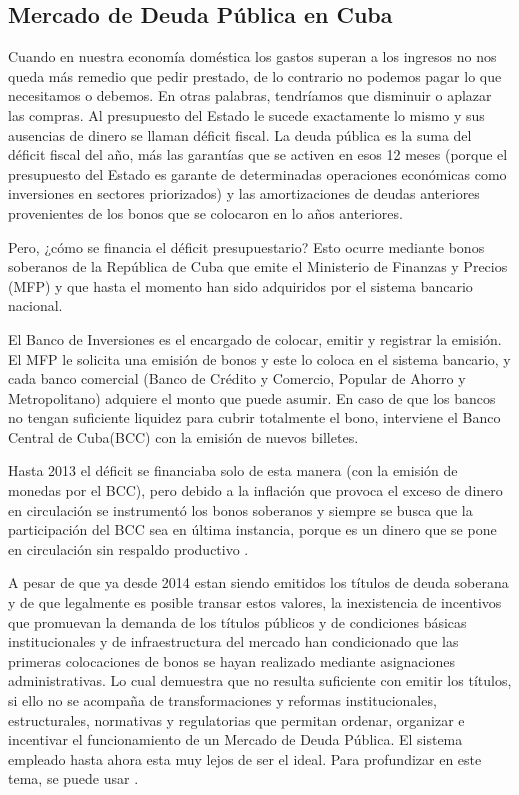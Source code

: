   \subsection{Mercado de Deuda Pública en Cuba} \hspace*{}

    Cuando en nuestra economía doméstica los gastos superan a los ingresos no nos queda más remedio que pedir prestado, de lo contrario 
    no podemos pagar lo que necesitamos o debemos. En otras palabras, tendríamos que disminuir o aplazar las compras. Al presupuesto del 
    Estado le sucede exactamente lo mismo y sus ausencias de dinero se llaman déficit fiscal. La deuda pública es la suma del déficit 
    fiscal del año, más las garantías que se activen en esos 12 meses (porque el presupuesto del Estado es garante de determinadas 
    operaciones económicas como inversiones en sectores priorizados) y las amortizaciones de deudas anteriores provenientes de los bonos 
    que se colocaron en lo años anteriores.

    Pero, ¿cómo se financia el déficit presupuestario? Esto ocurre mediante bonos soberanos de la República de 
    Cuba que emite el Ministerio de Finanzas y Precios (MFP) y que hasta el momento han sido adquiridos por el sistema bancario nacional.

    El Banco de Inversiones es el encargado de colocar, emitir y registrar la emisión. El MFP le solicita una emisión de bonos y este lo 
    coloca en el sistema bancario, y cada banco comercial (Banco de Crédito y Comercio, Popular de Ahorro y Metropolitano) adquiere el 
    monto que puede asumir. En caso de que los bancos no tengan suficiente liquidez para cubrir totalmente el bono, interviene el Banco 
    Central de Cuba(BCC) con la emisión de nuevos billetes.

    Hasta 2013 el déficit se financiaba solo de esta manera (con la emisión de monedas por el BCC), pero debido a la inflación que 
    provoca el exceso de dinero en circulación se instrumentó los bonos soberanos y siempre se busca que la participación del BCC sea 
    en última instancia, porque es un dinero que se pone en circulación sin respaldo productivo \parencite{carmona2021}. 

    A pesar de que ya desde 2014 estan siendo emitidos los títulos de deuda soberana y de que legalmente
    es posible transar estos valores, la inexistencia de incentivos que promuevan la
    demanda de los títulos públicos y de condiciones básicas institucionales y de
    infraestructura del mercado han condicionado que las primeras colocaciones de bonos
    se hayan realizado mediante asignaciones administrativas. Lo cual demuestra que no
    resulta suficiente con emitir los títulos, si ello no se acompaña de transformaciones y
    reformas institucionales, estructurales, normativas y regulatorias que permitan ordenar,
    organizar e incentivar el funcionamiento de un Mercado de Deuda Pública. El sistema empleado hasta ahora
    esta muy lejos de ser el ideal. Para profundizar en este tema, se puede usar \parencite{barcelo2017}.

